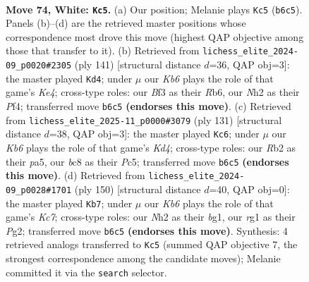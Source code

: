 \documentclass[11pt]{article}
\begin{document}
\clearpage

\begin{figure}[p]\centering
\begin{subfigure}{0.46\textwidth}\centering
\resizebox{\linewidth}{!}{%
\newchessgame
\chessboard[
  setfen={2b5/B4k2/1K6/8/PP6/5B1p/1R5N/6r1 w - - 5 74},
  showmover=false,
  pgfstyle=straightmove, color=movearrow, markmove={b6-c5}
]}
\caption{}
\end{subfigure}\hfill
\begin{subfigure}{0.46\textwidth}\centering
\resizebox{\linewidth}{!}{%
\newchessgame
\chessboard[
  setfen={8/8/1r1b2p1/4k3/5pB1/4pP2/2R5/5K2 b - - 3 71},
  showmover=false,
  pgfstyle=straightmove, color=movearrow, markmove={e5-d4}
]}
\caption{}
\end{subfigure}
\\[4pt]
\begin{subfigure}{0.46\textwidth}\centering
\resizebox{\linewidth}{!}{%
\newchessgame
\chessboard[
  setfen={7R/8/p2nb3/P1pk4/8/4K3/8/4B3 b - - 10 66},
  showmover=false,
  pgfstyle=straightmove, color=movearrow, markmove={d5-c6}
]}
\caption{}
\end{subfigure}\hfill
\begin{subfigure}{0.46\textwidth}\centering
\resizebox{\linewidth}{!}{%
\newchessgame
\chessboard[
  setfen={8/2K4p/P1BN4/6p1/1k6/8/6P1/6b1 w - - 5 76},
  showmover=false,
  pgfstyle=straightmove, color=movearrow, markmove={c7-b7}
]}
\caption{}
\end{subfigure}
\caption{\textbf{Move 74, White: \texttt{Kc5}.} (a) Our position; Melanie plays \texttt{Kc5} (\texttt{b6c5}). Panels (b)--(d) are the retrieved master positions whose correspondence most drove this move (highest QAP objective among those that transfer to it). (b) Retrieved from \texttt{lichess\_elite\_2024-09\_p0020\#2305} (ply 141) [structural distance $d$=36, QAP obj=3]: the master played \texttt{Kd4}; under $\mu$ our \emph{Kb6} plays the role of that game's \emph{Ke4}; cross-type roles: our \emph{B}f3 as their \emph{R}b6, our \emph{N}h2 as their \emph{P}f4; transferred move \texttt{b6c5} \textbf{(endorses this move)}. (c) Retrieved from \texttt{lichess\_elite\_2025-11\_p0000\#3079} (ply 131) [structural distance $d$=38, QAP obj=3]: the master played \texttt{Kc6}; under $\mu$ our \emph{Kb6} plays the role of that game's \emph{Kd4}; cross-type roles: our \emph{R}b2 as their \emph{p}a5, our \emph{b}c8 as their \emph{P}c5; transferred move \texttt{b6c5} \textbf{(endorses this move)}. (d) Retrieved from \texttt{lichess\_elite\_2024-09\_p0028\#1701} (ply 150) [structural distance $d$=40, QAP obj=0]: the master played \texttt{Kb7}; under $\mu$ our \emph{Kb6} plays the role of that game's \emph{Kc7}; cross-type roles: our \emph{N}h2 as their \emph{b}g1, our \emph{r}g1 as their \emph{P}g2; transferred move \texttt{b6c5} \textbf{(endorses this move)}. Synthesis: 4 retrieved analogs transferred to \texttt{Kc5} (summed QAP objective 7, the strongest correspondence among the candidate moves); Melanie committed it via the \texttt{search} selector.}
\label{fig:thought-m146}
\end{figure}
\end{document}
